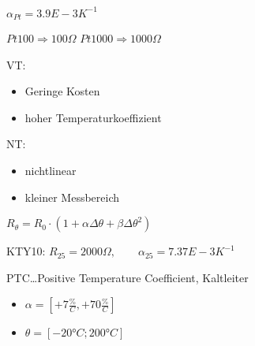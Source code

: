 \documentclass[letterpaper,10pt,english]{jupyterBook}
\begin{document}
\sphinxAtStartPar
\(\alpha_{Pt} = 3.9E-3 K^{-1}\)

\sphinxAtStartPar
\(Pt100 \Rightarrow 100 \Omega\)
\(Pt1000 \Rightarrow 1000 \Omega\)

\begin{DUlineblock}{0em}
\item[] 
\end{DUlineblock}

\sphinxAtStartPar
VT:
\begin{itemize}
\item {} 
\sphinxAtStartPar
Geringe Kosten

\item {} 
\sphinxAtStartPar
hoher Temperaturkoeffizient

\end{itemize}

\sphinxAtStartPar
NT:
\begin{itemize}
\item {} 
\sphinxAtStartPar
nichtlinear

\item {} 
\sphinxAtStartPar
kleiner Messbereich

\end{itemize}

\sphinxAtStartPar
\(R_{\theta} = R_0\cdot\left(1 + \alpha\Delta\theta + \beta\Delta\theta^2\right)\)

\sphinxAtStartPar
KTY10: \(R_{25} = 2000\Omega,\qquad\alpha_{25} = 7.37E-3 K^{-1}\)

\begin{DUlineblock}{0em}
\item[] 
\end{DUlineblock}

\sphinxAtStartPar
PTC…Positive Temperature Coefficient, Kaltleiter

\sphinxAtStartPar
{}
\begin{itemize}
\item {} 
\sphinxAtStartPar
\(\alpha = [+7\frac{\%}{C}, +70\frac{\%}{C}]\)

\item {} 
\sphinxAtStartPar
\(\theta = [-20°C; 200°C]\)

\end{itemize}

\begin{DUlineblock}{0em}
\item[] 
\end{DUlineblock}
\end{document}
